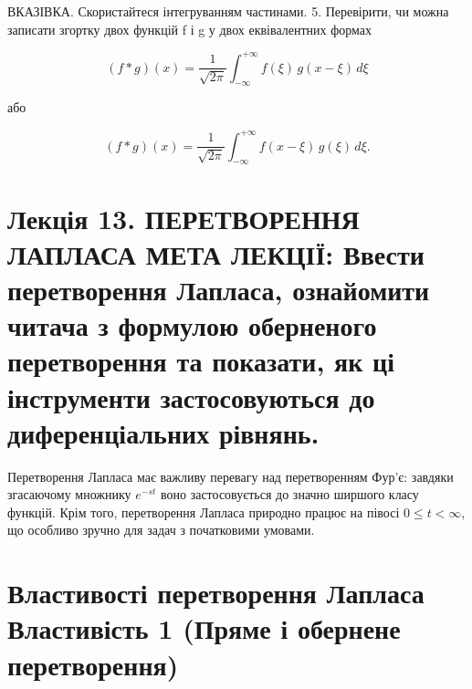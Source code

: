 \documentclass[
  ukrainian,
]{article}
\begin{document}
ВКАЗІВКА. Скористайтеся інтегруванням частинами. 5. Перевірити, чи можна
записати згортку двох функцій f і g у двох еквівалентних формах

\[
(f * g)(x) = \frac{1}{\sqrt{2\pi}} \int_{-\infty}^{+\infty} f(\xi)\, g(x - \xi)\, d\xi
\]

або

\[
(f * g)(x) = \frac{1}{\sqrt{2\pi}} \int_{-\infty}^{+\infty} f(x-\xi)\, g(\xi)\, d\xi.
\]

\section{Лекція 13. ПЕРЕТВОРЕННЯ ЛАПЛАСА МЕТА ЛЕКЦІЇ: Ввести
перетворення Лапласа, ознайомити читача з формулою оберненого
перетворення та показати, як ці інструменти застосовуються до
диференціальних
рівнянь.}\label{ux43bux435ux43aux446ux456ux44f-13.-ux43fux435ux440ux435ux442ux432ux43eux440ux435ux43dux43dux44f-ux43bux430ux43fux43bux430ux441ux430-ux43cux435ux442ux430-ux43bux435ux43aux446ux456ux457-ux432ux432ux435ux441ux442ux438-ux43fux435ux440ux435ux442ux432ux43eux440ux435ux43dux43dux44f-ux43bux430ux43fux43bux430ux441ux430-ux43eux437ux43dux430ux439ux43eux43cux438ux442ux438-ux447ux438ux442ux430ux447ux430-ux437-ux444ux43eux440ux43cux443ux43bux43eux44e-ux43eux431ux435ux440ux43dux435ux43dux43eux433ux43e-ux43fux435ux440ux435ux442ux432ux43eux440ux435ux43dux43dux44f-ux442ux430-ux43fux43eux43aux430ux437ux430ux442ux438-ux44fux43a-ux446ux456-ux456ux43dux441ux442ux440ux443ux43cux435ux43dux442ux438-ux437ux430ux441ux442ux43eux441ux43eux432ux443ux44eux442ux44cux441ux44f-ux434ux43e-ux434ux438ux444ux435ux440ux435ux43dux446ux456ux430ux43bux44cux43dux438ux445-ux440ux456ux432ux43dux44fux43dux44c.}

Перетворення Лапласа має важливу перевагу над перетворенням Фур'є:
завдяки згасаючому множнику \(e^{-st}\) воно застосовується до значно
ширшого класу функцій. Крім того, перетворення Лапласа природно працює
на півосі \(0 \le t < \infty\), що особливо зручно для задач з
початковими умовами.

\section{Властивості перетворення Лапласа Властивість 1 (Пряме і
обернене
перетворення)}\label{ux432ux43bux430ux441ux442ux438ux432ux43eux441ux442ux456-ux43fux435ux440ux435ux442ux432ux43eux440ux435ux43dux43dux44f-ux43bux430ux43fux43bux430ux441ux430-ux432ux43bux430ux441ux442ux438ux432ux456ux441ux442ux44c-1-ux43fux440ux44fux43cux435-ux456-ux43eux431ux435ux440ux43dux435ux43dux435-ux43fux435ux440ux435ux442ux432ux43eux440ux435ux43dux43dux44f}
\end{document}
